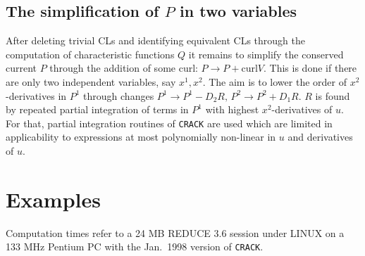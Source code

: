 \subsection{The simplification of $P$ in two variables}
After deleting trivial CLs and identifying equivalent CLs
through the computation of characteristic functions $Q$ it remains
to simplify the conserved current $P$ through the addition of
some curl: $P \rightarrow P+\mbox{curl} V$. 
This is done if there are only two independent
variables, say $x^1,x^2$. The aim is to lower the order of 
$x^2$-derivatives in $P^1$ through changes $P^1 \rightarrow P^1 - D_2 R,\,
P^2 \rightarrow P^2 + D_1 R$. $R$ is found by repeated
partial integration of terms in $P^1$ with highest $x^2$-derivatives
of $u$. For that, partial integration routines of {\tt CRACK} are
used which are limited in applicability
to expressions at most polynomially non-linear
in $u$ and derivatives of $u$.

\section{Examples}
Computation times refer to a 24 MB REDUCE 3.6 session under LINUX
on a 133 MHz Pentium PC with the Jan.\ 1998 version of {\tt CRACK}.

